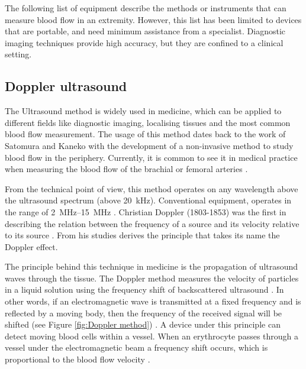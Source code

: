 The following list of equipment describe the methods or instruments that can measure blood flow in an extremity. However, this list has been limited to devices that are portable, and need minimum assistance from a specialist. Diagnostic imaging techniques provide high accuracy, but they are confined to a clinical setting.

\subsection{Doppler ultrasound}
\label{section literature UD}
The Ultrasound method is widely used in medicine, which can be applied to different fields like diagnostic imaging, localising tissues and the most common blood flow measurement. The usage of this method dates back to the work of Satomura and Kaneko \cite{satomura1959study} with the development of a non-invasive method to study blood flow in the periphery. Currently, it is common to see it in medical practice when measuring the blood flow of the brachial or femoral arteries \cite{casey2008measuring}. 

From the technical point of view, this method operates on any wavelength above the ultrasound spectrum (above \SI{20}{\kilo\hertz}). Conventional equipment, operates in the range of \SIrange{2}{15}{\mega\hertz} \cite{jayanthy2011measuring}. Christian Doppler (1803-1853) was the first in describing the relation between the frequency of a source and its velocity relative to its source \cite{surgeonhand2002Hand}. From his studies derives the principle that takes its name the Doppler effect. 

The principle behind this technique in medicine is the propagation of ultrasound waves through the tissue. The Doppler method measures the velocity of particles in a liquid solution using the frequency shift of backscattered ultrasound \cite{orekhova2013doppler}. In other words, if an electromagnetic wave is transmitted at a fixed frequency and is reflected by a moving body, then the frequency of the received signal will be shifted (see Figure \ref{fig:Doppler method}) \cite{jayanthy2011measuring, ht:MD2, surgeonhand2002Hand, casey2008measuring}. A device under this principle can detect moving blood cells within a vessel. When an erythrocyte passes through a vessel under the electromagnetic beam a frequency shift occurs, which is proportional to the blood flow velocity \cite{gill1979pulsed}.


